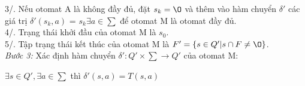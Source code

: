 \begin{flushleft}
\hspace{10mm}3/. Nếu otomat A là không đầy đủ, đặt $s_k = \O$ và thêm vào hàm chuyển $\delta'$ các giá trị $\delta'(s_k, a)$ = $s_k \exists a \in \sum$ để otomat M là otomat đầy đủ.\\
\hspace{10mm} 4/. Trạng thái khởi đầu của otomat M là $s_0$.\\
\hspace{10mm} 5/. Tập trạng thái kết thúc của otomat M là $F' = \{s \in Q' | s \cap F \ne \O \}$.\\
\textit{Bước 3:} Xác định hàm chuyển $\delta': Q' \times \sum \to Q'$ của otomat M:\\
\end{flushleft}
$\exists s \in Q', \exists a \in \sum $ thì $ \delta'(s, a) = T(s, a)$\\
